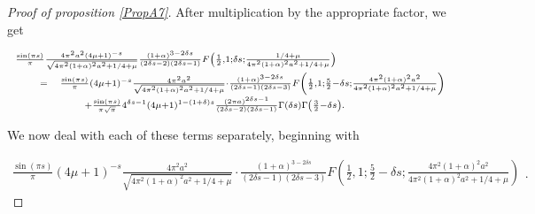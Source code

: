 \documentclass{jams-l}
\theoremstyle{definition}
\theoremstyle{remark}
\numberwithin{equation}{section}
\begin{document}
\begin{proof}[Proof of proposition \ref{PropA7}]
                    \noindent After multiplication by the appropriate factor, we get
                    
                    \[ \begin{array}{lll}
                            \multicolumn{3}{l}{\scriptstyle \frac{\sin \left( \pi s \right)}{\pi} \frac{4 \pi^2 a^2 \left( 4 \mu + 1 \right)^{-s}}{\sqrt{4 \pi^2 \left( 1 + \alpha \right)^2 a^2 + 1/4 + \mu}} \frac{\left( 1 + \alpha \right)^{3 - 2 \delta s}}{\left( 2 \delta s - 2 \right) \left( 2 \delta s - 1 \right)} F \left( \frac{1}{2}, 1; \delta s; \frac{1/4 + \mu}{4 \pi^2 \left( 1 + \alpha \right)^2 a^2 + 1/4 + \mu} \right)} \\[0.5em]
                            
                            \quad & \scriptstyle = & \scriptstyle \frac{\sin \left( \pi s \right)}{\pi} \left( 4 \mu + 1 \right)^{-s} \frac{4 \pi^2 a^2}{\sqrt{4 \pi^2 \left( 1 + \alpha \right)^2 a^2 + 1/4 + \mu}} \cdot \frac{\left( 1 + \alpha \right)^{3 - 2 \delta s}}{\left( 2 \delta s - 1 \right) \left( 2 \delta s - 3 \right)} F \left( \frac{1}{2}, 1; \frac{5}{2} - \delta s; \frac{4 \pi^2 \left( 1 + \alpha \right)^2 a^2}{4 \pi^2 \left( 1 + \alpha \right)^2 a^2 + 1/4 + \mu} \right) \\[0.5em]
                            
                            && \qquad \scriptstyle + \frac{\sin \left( \pi s \right)}{\pi \sqrt{\pi}} 4^{\delta s - 1} \left( 4 \mu + 1 \right)^{1 - \left( 1 + \delta \right) s} \frac{\left( 2 \pi a \right)^{2 \delta s - 1}}{\left( 2 \delta s - 2 \right) \left( 2 \delta s - 1 \right)}  \Gamma \left( \delta s \right) \Gamma \left( \frac{3}{2} - \delta s \right).
                        \end{array} \]
                    
                    \noindent We now deal with each of these terms separately, beginning with
                    
                    \[ \begin{array}{l}
                            \scriptstyle \frac{\sin \left( \pi s \right)}{\pi} \left( 4 \mu + 1 \right)^{-s} \frac{4 \pi^2 a^2}{\sqrt{4 \pi^2 \left( 1 + \alpha \right)^2 a^2 + 1/4 + \mu}} \cdot \frac{\left( 1 + \alpha \right)^{3 - 2 \delta s}}{\left( 2 \delta s - 1 \right) \left( 2 \delta s - 3 \right)} F \left( \frac{1}{2}, 1; \frac{5}{2} - \delta s; \frac{4 \pi^2 \left( 1 + \alpha \right)^2 a^2}{4 \pi^2 \left( 1 + \alpha \right)^2 a^2 + 1/4 + \mu} \right)
                        \end{array} . \]
                    

\end{proof}
\end{document}
